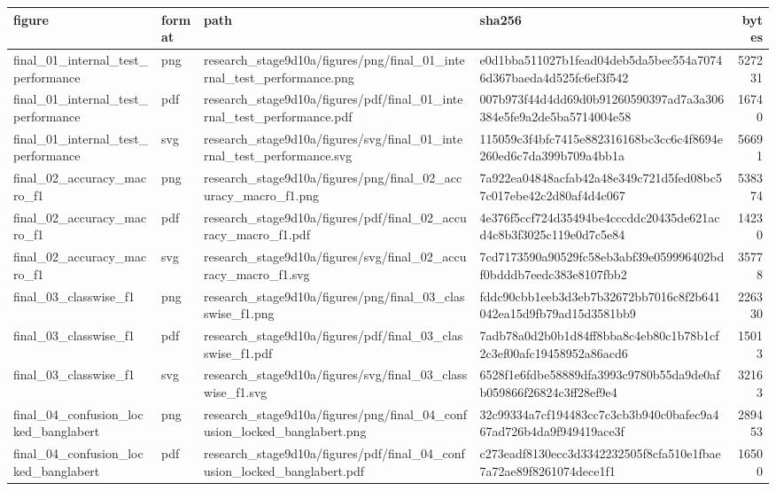 \begin{tabular}{llllr}
\toprule
figure & format & path & sha256 & bytes \\
\midrule
final\_01\_internal\_test\_performance & png & research\_stage9d10a/figures/png/final\_01\_internal\_test\_performance.png & e0d1bba511027b1fead04deb5da5bec554a70746d367baeda4d525fc6ef3f542 & 527231 \\
final\_01\_internal\_test\_performance & pdf & research\_stage9d10a/figures/pdf/final\_01\_internal\_test\_performance.pdf & 007b973f44d4dd69d0b91260590397ad7a3a306384e5fe9a2de5ba5714004e58 & 16740 \\
final\_01\_internal\_test\_performance & svg & research\_stage9d10a/figures/svg/final\_01\_internal\_test\_performance.svg & 115059c3f4bfc7415e882316168bc3cc6c4f8694e260ed6c7da399b709a4bb1a & 56691 \\
final\_02\_accuracy\_macro\_f1 & png & research\_stage9d10a/figures/png/final\_02\_accuracy\_macro\_f1.png & 7a922ea04848acfab42a48e349c721d5fed08bc57c017ebe42c2d80af4d4c067 & 538374 \\
final\_02\_accuracy\_macro\_f1 & pdf & research\_stage9d10a/figures/pdf/final\_02\_accuracy\_macro\_f1.pdf & 4e376f5ccf724d35494be4cccddc20435de621acd4c8b3f3025c119e0d7c5e84 & 14230 \\
final\_02\_accuracy\_macro\_f1 & svg & research\_stage9d10a/figures/svg/final\_02\_accuracy\_macro\_f1.svg & 7cd7173590a90529fc58eb3abf39e059996402bdf0bdddb7eedc383e8107fbb2 & 35778 \\
final\_03\_classwise\_f1 & png & research\_stage9d10a/figures/png/final\_03\_classwise\_f1.png & fddc90cbb1eeb3d3eb7b32672bb7016c8f2b641042ea15d9fb79ad15d3581bb9 & 226330 \\
final\_03\_classwise\_f1 & pdf & research\_stage9d10a/figures/pdf/final\_03\_classwise\_f1.pdf & 7adb78a0d2b0b1d84ff8bba8c4eb80c1b78b1cf2c3ef00afc19458952a86acd6 & 15013 \\
final\_03\_classwise\_f1 & svg & research\_stage9d10a/figures/svg/final\_03\_classwise\_f1.svg & 6528f1e6fdbe58889dfa3993c9780b55da9de0afb059866f26824c3ff28ef9e4 & 32163 \\
final\_04\_confusion\_locked\_banglabert & png & research\_stage9d10a/figures/png/final\_04\_confusion\_locked\_banglabert.png & 32c99334a7cf194483cc7c3cb3b940c0bafec9a467ad726b4da9f949419ace3f & 289453 \\
final\_04\_confusion\_locked\_banglabert & pdf & research\_stage9d10a/figures/pdf/final\_04\_confusion\_locked\_banglabert.pdf & c273eadf8130ecc3d3342232505f8cfa510e1fbae7a72ae89f8261074dece1f1 & 16500 \\

\end{tabular}
